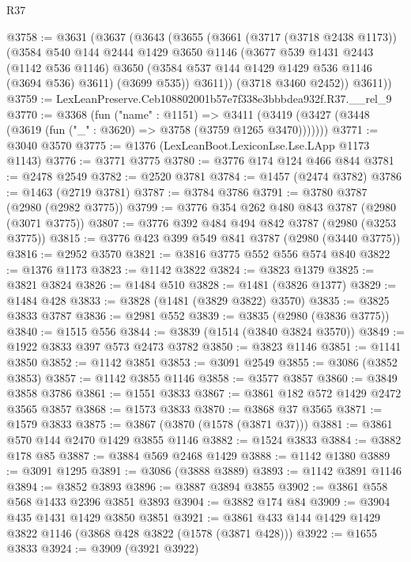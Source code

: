 \begin{lexlean}{R37}
\begin{coremodule}
@3758 := @3631
    (@3637
      (@3643
        (@3655
          (@3661
            (@3717 (@3718 @2438 @1173))
            (@3584
              @540
              @144
              @2444
              @1429
              @3650
              @1146
              (@3677
                @539
                @1431
                @2443
                (@1142 @536 @1146)
                @3650
                (@3584 @537 @144 @1429 @1429 @536 @1146 (@3694 @536) @3611)
                (@3699 @535))
              @3611))
          (@3718 @3460 @2452))
        @3611))
@3759 := LexLeanPreserve.Ceb108802001b57e7f338e3bbbdea932f.R37.__rel_9
@3770 := @3368
    (fun ("name" : @1151) =>
    @3411 (@3419 (@3427 (@3448 (@3619 (fun ("_" : @3620) => @3758 (@3759 @1265 @3470)))))))
@3771 := @3040 @3570
@3775 := @1376 (LexLeanBoot.LexiconLse.Lse.LApp @1173 @1143)
@3776 := @3771 @3775
@3780 := @3776 @174 @124 @466 @844
@3781 := @2478 @2549
@3782 := @2520 @3781
@3784 := @1457 (@2474 @3782)
@3786 := @1463 (@2719 @3781)
@3787 := @3784 @3786
@3791 := @3780 @3787 (@2980 (@2982 @3775))
@3799 := @3776 @354 @262 @480 @843 @3787 (@2980 (@3071 @3775))
@3807 := @3776 @392 @484 @494 @842 @3787 (@2980 (@3253 @3775))
@3815 := @3776 @423 @399 @549 @841 @3787 (@2980 (@3440 @3775))
@3816 := @2952 @3570
@3821 := @3816 @3775 @552 @556 @574 @840
@3822 := @1376 @1173
@3823 := @1142 @3822
@3824 := @3823 @1379
@3825 := @3821 @3824
@3826 := @1484 @510
@3828 := @1481 (@3826 @1377)
@3829 := @1484 @428
@3833 := @3828 (@1481 (@3829 @3822) @3570)
@3835 := @3825 @3833 @3787
@3836 := @2981 @552
@3839 := @3835 (@2980 (@3836 @3775))
@3840 := @1515 @556
@3844 := @3839 (@1514 (@3840 @3824 @3570))
@3849 := @1922 @3833 @397 @573 @2473 @3782
@3850 := @3823 @1146
@3851 := @1141 @3850
@3852 := @1142 @3851
@3853 := @3091 @2549
@3855 := @3086 (@3852 @3853)
@3857 := @1142 @3855 @1146
@3858 := @3577 @3857
@3860 := @3849 @3858 @3786
@3861 := @1551 @3833
@3867 := @3861 @182 @572 @1429 @2472 @3565 @3857
@3868 := @1573 @3833
@3870 := @3868 @37 @3565
@3871 := @1579 @3833
@3875 := @3867 (@3870 (@1578 (@3871 @37)))
@3881 := @3861 @570 @144 @2470 @1429 @3855 @1146
@3882 := @1524 @3833
@3884 := @3882 @178 @85
@3887 := @3884 @569 @2468 @1429
@3888 := @1142 @1380
@3889 := @3091 @1295
@3891 := @3086 (@3888 @3889)
@3893 := @1142 @3891 @1146
@3894 := @3852 @3893
@3896 := @3887 @3894 @3855
@3902 := @3861 @558 @568 @1433 @2396 @3851 @3893
@3904 := @3882 @174 @84
@3909 := @3904 @435 @1431 @1429 @3850 @3851
@3921 := @3861 @433 @144 @1429 @1429 @3822 @1146 (@3868 @428 @3822 (@1578 (@3871 @428)))
@3922 := @1655 @3833
@3924 := @3909 (@3921 @3922)

\end{coremodule}
\end{lexlean}
